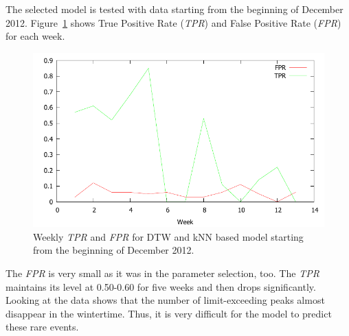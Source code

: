 The selected model is tested with data starting from the beginning of December 2012. Figure~\ref{fig:voc_dtwknn_test} shows True Positive Rate (\emph{TPR}) and False Positive Rate (\emph{FPR}) for each week.

\begin{center}
\begin{figure}[h!]
\includegraphics[scale=1.0]{images/voc_dtwknn_test.pdf}
\caption{Weekly \emph{TPR} and \emph{FPR} for DTW and kNN based model starting from the beginning of December 2012.}
\label{fig:voc_dtwknn_test}
\end{figure}
\end{center}

The \emph{FPR} is very small as it was in the parameter selection, too. The \emph{TPR} maintains its level at 0.50-0.60 for five weeks and then drops significantly. Looking at the data shows that the number of limit-exceeding peaks almost disappear in the wintertime. Thus, it is very difficult for the model to predict these rare events.